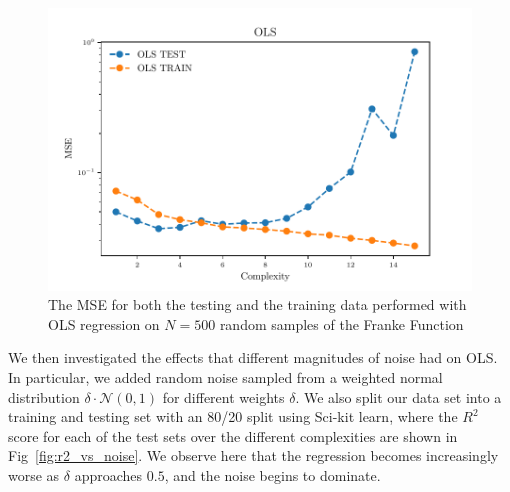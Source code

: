 \documentclass[reprint, english, nofootinbib]{revtex4-2}
\begin{document}
\begin{figure}[h!tb]
    \center
    \includegraphics[width=\columnwidth]{../figs/OLS_MSE_Bootstrap_Hastie_211_N_500.pdf}
    \caption{\label{fig:Hastie2.11 MSE Bootstrap}The MSE for both the testing and the training data performed with OLS regression on $N=500$ random samples of the Franke Function}
\end{figure}

We then investigated the effects that different magnitudes of noise had on OLS. In particular, we added random noise sampled from a weighted normal distribution $\delta \cdot \mathcal N(0, 1)$ for different weights $\delta$. We also split our data set into a training and testing set with an 80/20 split using Sci-kit learn, where the $R^2$ score for each of the test sets over the different complexities are shown in Fig~\ref{fig:r2_vs_noise}.
We observe here that the regression becomes increasingly worse as $\delta$ approaches $0.5$, and the noise begins to dominate.
\end{document}
